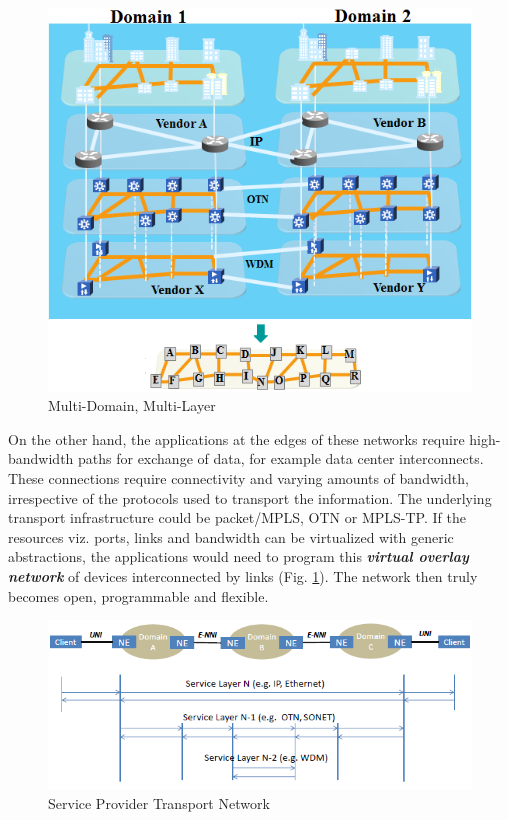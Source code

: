 \documentclass{sig-alternate-2013}
\begin{document}
\begin{figure}[htb]
	\centering
	\includegraphics[scale=0.50]{MultiDomainLayer.png}
	\caption{Multi-Domain, Multi-Layer}
	\label{fig:MDL}
	\end{figure}
	
	On the other hand, the applications at the edges of these networks require high-bandwidth paths for exchange of data, for example data center interconnects.
	These connections require connectivity and varying amounts of bandwidth, irrespective of the protocols used to transport the information. The underlying
	transport infrastructure could be packet/MPLS, OTN or MPLS-TP. If the resources viz. ports, links and bandwidth can be virtualized with generic abstractions, 
	the applications would need to program this \emph{\bf virtual overlay network} of devices interconnected by links (Fig. \ref{fig:MDL}). The network then truly becomes open, 
	programmable and flexible. \\
		
	\begin{figure}[htb]
	\centering
	\includegraphics[scale=0.50]{MLwoOF.png}
	\caption{Service Provider Transport Network}
	\label{fig:MLwoOF}
	\end{figure}
\end{document}

